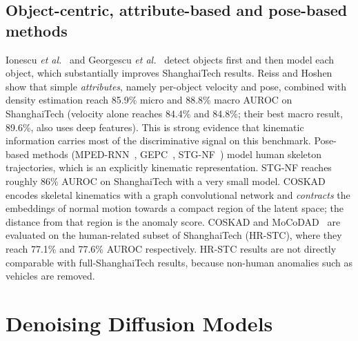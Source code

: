 \documentclass[11pt,a4paper]{article}
\begin{document}
\subsection{Object-centric, attribute-based and pose-based methods}
Ionescu \emph{et al.}~\cite{ionescu2019object} and Georgescu \emph{et al.}~\cite{georgescu2021anomaly} detect objects first and then model each object, which substantially improves ShanghaiTech results. Reiss and Hoshen~\cite{reiss2022attribute} show that simple \emph{attributes}, namely per-object velocity and pose, combined with density estimation reach 85.9\% micro and 88.8\% macro AUROC on ShanghaiTech (velocity alone reaches 84.4\% and 84.8\%; their best macro result, 89.6\%, also uses deep features). This is strong evidence that kinematic information carries most of the discriminative signal on this benchmark. Pose-based methods (MPED-RNN~\cite{morais2019learning}, GEPC~\cite{markovitz2020graph}, STG-NF~\cite{hirschorn2023normalizing}) model human skeleton trajectories, which is an explicitly kinematic representation. STG-NF reaches roughly 86\% AUROC on ShanghaiTech with a very small model. COSKAD~\cite{flaborea2024coskad} encodes skeletal kinematics with a graph convolutional network and \emph{contracts} the embeddings of normal motion towards a compact region of the latent space; the distance from that region is the anomaly score. COSKAD and MoCoDAD~\cite{flaborea2023multimodal} are evaluated on the human-related subset of ShanghaiTech (HR-STC), where they reach 77.1\% and 77.6\% AUROC respectively. HR-STC results are not directly comparable with full-ShanghaiTech results, because non-human anomalies such as vehicles are removed.

\section{Denoising Diffusion Models}
\end{document}
